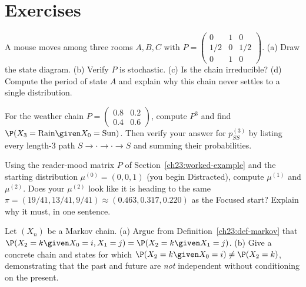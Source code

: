 \section{Exercises}
\label{ch23:exercises}

\begin{exercise}
\label{ch23:ex-read-matrix}
A mouse moves among three rooms $A, B, C$ with
$P = \left(\begin{smallmatrix} 0 & 1 & 0 \\ 1/2 & 0 & 1/2 \\ 0 & 1 & 0 \end{smallmatrix}\right)$.
(a) Draw the state diagram. (b) Verify $P$ is stochastic. (c) Is the chain irreducible?
(d) Compute the period of state $A$ and explain why this chain never settles to a single
distribution.
\end{exercise}

\begin{exercise}
\label{ch23:ex-twostep}
For the weather chain $P = \left(\begin{smallmatrix} 0.8 & 0.2 \\ 0.4 & 0.6 \end{smallmatrix}\right)$,
compute $P^3$ and find $\P(X_3 = \text{Rain} \given X_0 = \text{Sun})$. Then verify your
answer for $p_{SS}^{(3)}$ by listing every length-$3$ path $S \to \cdot \to \cdot \to S$ and
summing their probabilities.
\end{exercise}

\begin{exercise}
\label{ch23:ex-push}
Using the reader-mood matrix $P$ of Section~\ref{ch23:worked-example} and the starting
distribution $\mu^{(0)} = (0,0,1)$ (you begin Distracted), compute $\mu^{(1)}$ and
$\mu^{(2)}$. Does your $\mu^{(2)}$ look like it is heading to the same $\pi = (19/41,
13/41, 9/41) \approx (0.463, 0.317, 0.220)$ as the Focused start? Explain why it must, in one sentence.
\end{exercise}

\begin{exercise}
\label{ch23:ex-memoryless}
Let $(X_n)$ be a Markov chain. (a) Argue from Definition~\ref{ch23:def-markov} that
$\P(X_2 = k \given X_0 = i, X_1 = j) = \P(X_2 = k \given X_1 = j)$. (b) Give a concrete chain
and states for which $\P(X_2 = k \given X_0 = i) \ne \P(X_2 = k)$, demonstrating that the
past and future are \emph{not} independent without conditioning on the present.
\end{exercise}


